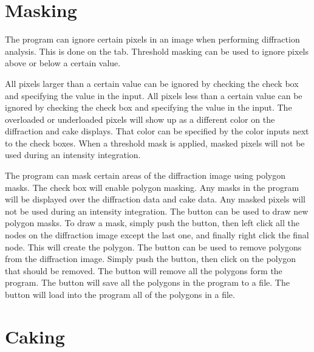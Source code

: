 \section{Masking}

The program can ignore certain pixels in an image
when performing diffraction analysis. This is done 
on the  tab.  Threshold masking can be 
used to ignore pixels above or below a certain value.

All pixels larger than a certain value can be ignored by
checking the  check box
and specifying the value in the 
 input.
All pixels less than a certain value can be ignored by
checking the  check box 
and specifying the value in the 
 input.
The overloaded or underloaded pixels will show up
as a different color on the diffraction and cake displays.
That color can be specified by the color inputs next to the 
check boxes. When a threshold mask is applied, masked pixels
will not be used during an intensity integration.

The program can mask certain areas of the diffraction image
using polygon masks. The  check box 
will enable polygon masking. Any masks in the program
will be displayed over the diffraction data and cake data.
Any masked pixels will not be used during an intensity
integration. The  button can be used to 
draw new polygon masks. To draw a mask, simply push
the button, then left click all the
nodes on the diffraction image except the last one, and
finally right click the final node. This will create the 
polygon. The  button can be used to 
remove polygons from the diffraction image. Simply push
the button, then click on the polygon that should be
removed. The  button will remove all
the polygons form the program. The  button
will save all the polygons in the program to a file.
The  button will load into the program
all of the polygons in a file.

\section{Caking}
\index{$\chi$}

